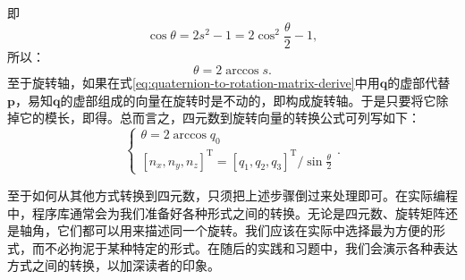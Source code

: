 即
\begin{equation}
\cos \theta =2s^2-1=2 \cos^2 \frac{\theta}{2} -1,
\end{equation}
所以：
\begin{equation}
\theta = 2 \arccos s.
\end{equation}
至于旋转轴，如果在式\eqref{eq:quaternion-to-rotation-matrix-derive}中用$\bm{q}$的虚部代替$\bm{p}$，易知$\bm{q}$的虚部组成的向量在旋转时是不动的，即构成旋转轴。于是只要将它除掉它的模长，即得。总而言之，四元数到旋转向量的转换公式可列写如下：
\begin{equation}
\label{eq:rotationVector2Quaternion}
\begin{cases}
\theta  = 2\arccos {q_0}\\
{\left[ {{n_x},{n_y},{n_z}} \right]^\mathrm{T}} = {{{\left[ {{q_1},{q_2},{q_3}} \right]}^\mathrm{T}}}/{\sin \frac{\theta }{2}}
\end{cases} .
\end{equation}

至于如何从其他方式转换到四元数，只须把上述步骤倒过来处理即可。在实际编程中，程序库通常会为我们准备好各种形式之间的转换。无论是四元数、旋转矩阵还是轴角，它们都可以用来描述同一个旋转。我们应该在实际中选择最为方便的形式，而不必拘泥于某种特定的形式。在随后的实践和习题中，我们会演示各种表达方式之间的转换，以加深读者的印象。


